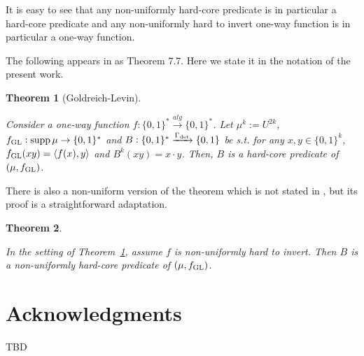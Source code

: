 \documentclass{article}
\theoremstyle{definition}
\theoremstyle{plain}
\newtheorem{theorem}{Theorem}[section]
\newcommand{\Words}{{\{ 0, 1 \}^*}}
\newcommand{\WordsLen}[1]{{\{ 0, 1 \}^{#1}}}
\newcommand{\Bool}{\{0,1\}}
\DeclareMathOperator{\Supp}{supp}
\newcommand{\Chev}[1]{\langle #1 \rangle}
\begin{document}
It is easy to see that any non-uniformly hard-core predicate is in particular a hard-core predicate and any non-uniformly hard to invert one-way function is in particular a one-way function.

The following appears in \cite{Goldreich_2008} as Theorem 7.7. Here we state it in the notation of the present work.

\begin{theorem}[Goldreich-Levin]
\label{thm:goldreich_levin}

Consider a one-way function ${f: \Words \xrightarrow{alg} \Words}$. Let $\mu^k:=U^{2k}$, $f_{\textnormal{GL}}: \Supp \mu \rightarrow \Words$ and ${B: \Words \xrightarrow{\Gamma_{\textnormal{det}}} \Bool}$ be s.t. for any $x,y \in \WordsLen{k}$, $f_{\textnormal{GL}}(xy)=\Chev{f(x),y}$ and ${B^k(xy)=x \cdot y}$. Then, $B$ is a hard-core predicate of $(\mu, f_{\textnormal{GL}})$.

\end{theorem}

There is also a non-uniform version of the theorem which is not stated in \cite{Goldreich_2008}, but its proof is a straightforward adaptation.

\begin{theorem}
\label{thm:goldreich_levin_circ}

In the setting of Theorem~\ref{thm:goldreich_levin}, assume $f$ is non-uniformly hard to invert. Then $B$ is a non-uniformly hard-core predicate of $(\mu, f_{\textnormal{GL}})$.
\end{theorem}

\section*{Acknowledgments}

TBD



\end{document}
